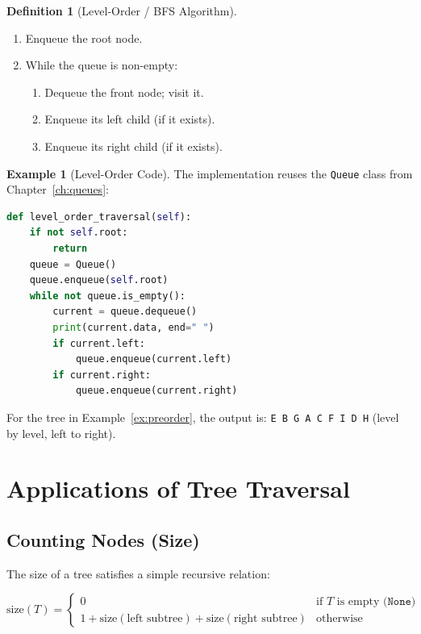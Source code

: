 \documentclass[11pt, a4paper, notitlepage]{report}
\theoremstyle{definition}
\newtheorem{definition}[theorem]{Definition}
\theoremstyle{remark}
\theoremstyle{definition}
\newtheorem{example}[theorem]{Example}
\begin{document}
\begin{definition}[Level-Order / BFS Algorithm]
\label{def:level-order}
\begin{enumerate}
  \item Enqueue the root node.
  \item While the queue is non-empty:
        \begin{enumerate}
          \item Dequeue the front node; visit it.
          \item Enqueue its left child (if it exists).
          \item Enqueue its right child (if it exists).
        \end{enumerate}
\end{enumerate}
\end{definition}

\begin{example}[Level-Order Code]
\label{ex:levelorder}
The implementation reuses the \texttt{Queue} class from
Chapter~\ref{ch:queues}:

\begin{lstlisting}[language=Python]
def level_order_traversal(self):
    if not self.root:
        return
    queue = Queue()
    queue.enqueue(self.root)
    while not queue.is_empty():
        current = queue.dequeue()
        print(current.data, end=" ")
        if current.left:
            queue.enqueue(current.left)
        if current.right:
            queue.enqueue(current.right)
\end{lstlisting}

For the tree in Example~\ref{ex:preorder}, the output is:
\texttt{E B G A C F I D H} \; (level by level, left to right).
\end{example}

\section{Applications of Tree Traversal}
\label{sec:bt-applications}

\subsection{Counting Nodes (Size)}
\label{subsec:count-nodes}

The size of a tree satisfies a simple recursive relation:

\[
  \text{size}(T) =
  \begin{cases}
    0 & \text{if } T \text{ is empty (}\texttt{None}\text{)} \\
    1 + \text{size}(\text{left subtree}) + \text{size}(\text{right subtree}) & \text{otherwise}
  \end{cases}
\]
\end{document}
